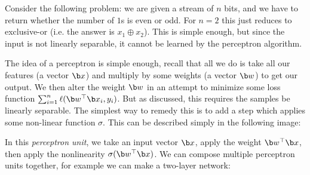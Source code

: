 Consider the following problem: we are given a stream of $n$ bits, and we have to return whether the number of $1$s is even or odd.
For $n=2$ this just reduces to exclusive-or (i.e. the answer is $x_1\oplus x_2$).
This is simple enough, but since the input is not linearly separable, it cannot be learned by the perceptron algorithm.

The idea of a perceptron is simple enough, recall that all we do is take all our features (a vector $\b x$) and multiply by some weights (a vector $\b w$) to get our output.
We then alter the weight $\b w$ in an attempt to minimize some loss function $\sum_{i=1}^n\ell(\b w^\top\b x_i,y_i)$.
But as discussed, this requires the samples be linearly separable.
The simplest way to remedy this is to add a step which applies some non-linear function $\sigma$.
This can be described simply in the following image:

{\def\diagcolbuf{1cm}\def\diagrowbuf{0cm}\centerline{}}

In this {\it perceptron unit}, we take an input vector $\b x$, apply the weight $\b w^\top\b x$, then apply the nonlinearity $\sigma(\b w^\top\b x)$.
We can compose multiple perceptron units together, for example we can make a two-layer network:

